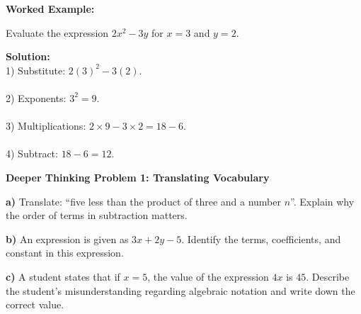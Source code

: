 \documentclass[12pt, letterpaper, fleqn]{article}
\begin{document}
\vspace{2mm}
\vspace{1cm}
\begin{tcolorbox}[colback=white, colframe=black!25, boxrule=0.6pt, arc=4mm, left=6mm, right=6mm, top=5mm, bottom=5mm]
\textbf{Worked Example:}

\medskip
\noindent
\vspace{0.2cm}

Evaluate the expression $2x^2 - 3y$ for $x = 3$ and $y = 2$.\\
\vspace{0.5cm}

\textbf{Solution:} \\
1) Substitute: $2(3)^2 - 3(2)$. \\ \\
2) Exponents: $3^2 = 9$. \\ \\
3) Multiplications: $2 \times 9 - 3 \times 2 = 18 - 6$. \\ \\
4) Subtract: $18 - 6 = 12$. \\
\vspace{0.5cm}

\end{tcolorbox}

\newpage

\begin{tcolorbox}[colback=white, colframe=black, boxrule=1pt, arc=4mm, left=6mm, right=6mm, top=5mm, bottom=5mm]
\textbf{Deeper Thinking Problem 1: Translating Vocabulary}

\medskip

\noindent
\textbf{a)} Translate: ``five less than the product of three and a number $n$''. Explain why the order of terms in subtraction matters.

\vspace{2cm}

\noindent
\textbf{b)} An expression is given as $3x + 2y - 5$. Identify the terms, coefficients, and constant in this expression.

\vspace{2cm}

\noindent
\textbf{c)} A student states that if $x = 5$, the value of the expression $4x$ is $45$. Describe the student's misunderstanding regarding algebraic notation and write down the correct value.

\vspace{3cm}

\end{tcolorbox}
\end{document}

